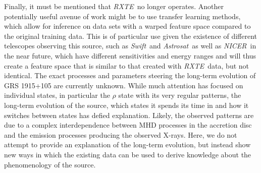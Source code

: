 \documentclass[fleqn,usenatbib]{mnras}
\newcommand{\project}[1]{\textsl{#1}}
\newcommand{\rxte}{\project{RXTE}}
\newcommand{\swift}{\project{Swift}}
\newcommand{\astrosat}{\project{Astrosat}}
\newcommand{\nicer}{\project{NICER}}
\begin{document}
Finally, it must be mentioned that \rxte\ no longer operates. Another potentially useful avenue of work might be to use transfer learning methods, which allow 
for inference on data sets with a warped feature space compared to the original training data. This is of particular use given the existence of different telescopes 
observing this source, such as \swift\ and \astrosat\, as well as \nicer\ in the near future, which have different sensitivities and energy ranges and will thus create 
a feature space that is similar to that created with \rxte\ data, but not identical.
The exact processes and parameters steering the long-term evolution of GRS 1915+105 are currently unknown. While much attention has focused on 
individual states, in particular the $\rho$ state with its very regular patterns, the long-term evolution of the source, which states it spends its time in and how 
it switches between states has defied explanation. Likely, the observed patterns are due to a complex interdependence between MHD processes in the accretion 
disc and the emission processes producing the observed X-rays. Here, we do not attempt to provide an explanation of the long-term evolution, but instead show 
new ways in which the existing data can be used to derive knowledge about the phenomenology of the source.
\end{document}
